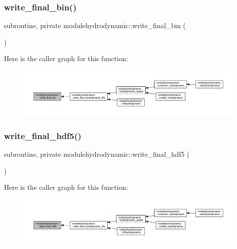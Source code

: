 \subsubsection{\texorpdfstring{write\+\_\+final\+\_\+bin()}{write\_final\_bin()}}
{\footnotesize\ttfamily subroutine, private modulehydrodynamic\+::write\+\_\+final\+\_\+bin (\begin{DoxyParamCaption}{ }\end{DoxyParamCaption})\hspace{0.3cm}{\ttfamily [private]}}

Here is the caller graph for this function\+:\nopagebreak
\begin{figure}[H]
\begin{center}
\leavevmode
\includegraphics[width=350pt]{namespacemodulehydrodynamic_a5bdef2c140ebc772066fbee498f4cccb_icgraph}
\end{center}
\end{figure}
\mbox{\label{namespacemodulehydrodynamic_af8baaec85d39b5b0c7ce04593a4ba674}} 
\subsubsection{\texorpdfstring{write\+\_\+final\+\_\+hdf5()}{write\_final\_hdf5()}}
{\footnotesize\ttfamily subroutine, private modulehydrodynamic\+::write\+\_\+final\+\_\+hdf5 (\begin{DoxyParamCaption}{ }\end{DoxyParamCaption})\hspace{0.3cm}{\ttfamily [private]}}

Here is the caller graph for this function\+:\nopagebreak
\begin{figure}[H]
\begin{center}
\leavevmode
\includegraphics[width=350pt]{namespacemodulehydrodynamic_af8baaec85d39b5b0c7ce04593a4ba674_icgraph}
\end{center}
\end{figure}
\mbox{\label{namespacemodulehydrodynamic_a633e5bd5e4240a071e45a505396056eb}} 
